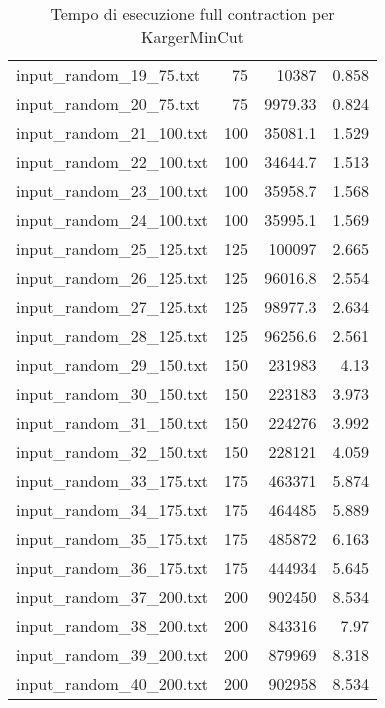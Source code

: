 \begin{table}[H]
\begin{tabular}{lrrr}
     input\_random\_19\_75.txt  &      75 &      10387     &              0.858 \\
     input\_random\_20\_75.txt  &      75 &       9979.33  &              0.824 \\
     input\_random\_21\_100.txt &     100 &      35081.1   &              1.529 \\
     input\_random\_22\_100.txt &     100 &      34644.7   &              1.513 \\
     input\_random\_23\_100.txt &     100 &      35958.7   &              1.568 \\
     input\_random\_24\_100.txt &     100 &      35995.1   &              1.569 \\
     input\_random\_25\_125.txt &     125 &     100097     &              2.665 \\
     input\_random\_26\_125.txt &     125 &      96016.8   &              2.554 \\
     input\_random\_27\_125.txt &     125 &      98977.3   &              2.634 \\
     input\_random\_28\_125.txt &     125 &      96256.6   &              2.561 \\
     input\_random\_29\_150.txt &     150 &     231983     &              4.13  \\
     input\_random\_30\_150.txt &     150 &     223183     &              3.973 \\
     input\_random\_31\_150.txt &     150 &     224276     &              3.992 \\
     input\_random\_32\_150.txt &     150 &     228121     &              4.059 \\
     input\_random\_33\_175.txt &     175 &     463371     &              5.874 \\
     input\_random\_34\_175.txt &     175 &     464485     &              5.889 \\
     input\_random\_35\_175.txt &     175 &     485872     &              6.163 \\
     input\_random\_36\_175.txt &     175 &     444934     &              5.645 \\
     input\_random\_37\_200.txt &     200 &     902450     &              8.534 \\
     input\_random\_38\_200.txt &     200 &     843316     &              7.97  \\
     input\_random\_39\_200.txt &     200 &     879969     &              8.318 \\
     input\_random\_40\_200.txt &     200 &     902958     &              8.534 \\
     \hline
    \end{tabular}

    \caption{Tempo di esecuzione full contraction per KargerMinCut}
    \label{table:karger-full-contraction}
\end{table}

